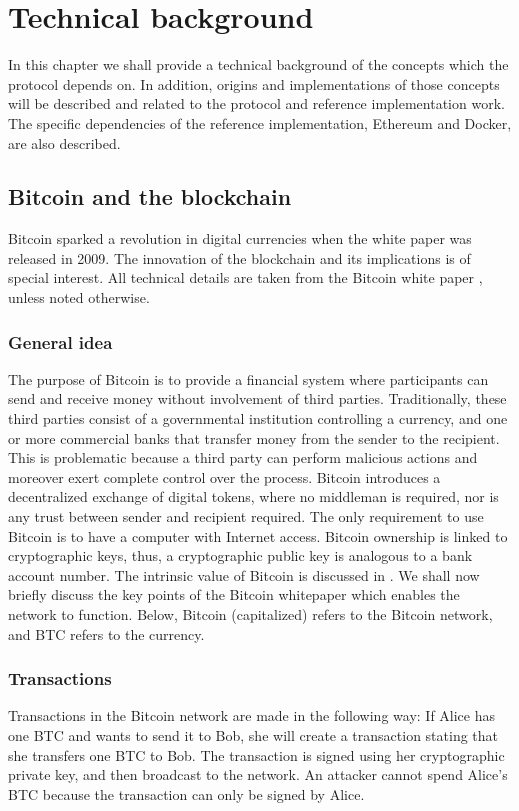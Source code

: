 \chapter{Technical background}
In this chapter we shall provide a technical background of the concepts which the protocol depends on. In addition, origins and implementations of those concepts will be described and related to the protocol and reference implementation work. The specific dependencies of the reference implementation, Ethereum and Docker, are also described.

\section{Bitcoin and the blockchain}
Bitcoin sparked a revolution in digital currencies when the white paper was released in 2009. The innovation of the blockchain and its implications is of special interest. All technical details are taken from the Bitcoin white paper \cite{btc}, unless noted otherwise.

\subsection{General idea}
The purpose of Bitcoin is to provide a financial system where participants can send and receive money without involvement of third parties. Traditionally, these third parties consist of a governmental institution controlling a currency, and one or more commercial banks that transfer money from the sender to the recipient. This is problematic because a third party can perform malicious actions and moreover exert complete control over the process. Bitcoin introduces a decentralized exchange of digital tokens, where no middleman is required, nor is any trust between sender and recipient required. The only requirement to use Bitcoin is to have a computer with Internet access. Bitcoin ownership is linked to cryptographic keys, thus, a cryptographic public key is analogous to a bank account number. The intrinsic value of Bitcoin is discussed in \cite{buterin:2011}. We shall now briefly discuss the key points of the Bitcoin whitepaper which enables the network to function. Below, Bitcoin (capitalized) refers to the Bitcoin network, and BTC refers to the currency.

\subsection{Transactions}
Transactions in the Bitcoin network are made in the following way: If Alice has one BTC and wants to send it to Bob, she will create a transaction stating that she transfers one BTC to Bob. The transaction is signed using her cryptographic private key, and then broadcast to the network. An attacker cannot spend Alice's BTC because the transaction can only be signed by Alice.

